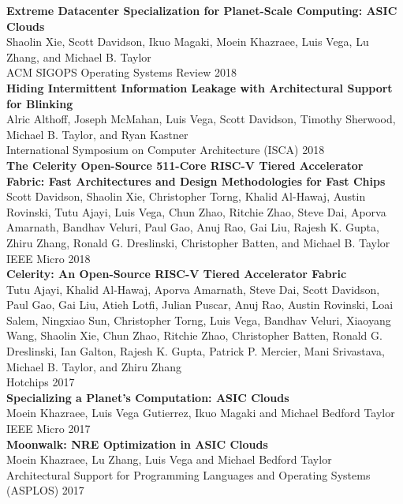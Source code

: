 \documentclass[10pt]{article}
\begin{document}
\textbf{%
  Extreme Datacenter Specialization for Planet-Scale Computing: ASIC Clouds
} \\
Shaolin Xie, Scott Davidson, Ikuo Magaki, Moein Khazraee, Luis Vega, Lu Zhang, and Michael B. Taylor \\
ACM SIGOPS Operating Systems Review 2018 \\
  
\textbf{%
  Hiding Intermittent Information Leakage with Architectural Support for Blinking
} \\
Alric Althoff, Joseph McMahan, Luis Vega, Scott Davidson, Timothy Sherwood,
Michael B. Taylor, and Ryan Kastner \\
International Symposium on Computer Architecture (ISCA) 2018 \\
  
\textbf{%
  The Celerity Open-Source 511-Core RISC-V Tiered Accelerator Fabric: Fast Architectures and Design Methodologies for Fast Chips
} \\
Scott Davidson, Shaolin Xie, Christopher Torng, Khalid Al-Hawaj, Austin Rovinski,
Tutu Ajayi, Luis Vega, Chun Zhao, Ritchie Zhao, Steve Dai, Aporva Amarnath,
Bandhav Veluri, Paul Gao, Anuj Rao, Gai Liu, Rajesh K. Gupta, Zhiru Zhang,
Ronald G. Dreslinski, Christopher Batten, and Michael B. Taylor \\
IEEE Micro 2018 \\

\textbf{%
  Celerity: An Open-Source RISC-V Tiered Accelerator Fabric
} \\
Tutu Ajayi, Khalid Al-Hawaj, Aporva Amarnath, Steve Dai, Scott Davidson,
Paul Gao, Gai Liu, Atieh Lotfi, Julian Puscar, Anuj Rao, Austin Rovinski,
Loai Salem, Ningxiao Sun, Christopher Torng, Luis Vega, Bandhav Veluri,
Xiaoyang Wang, Shaolin Xie, Chun Zhao, Ritchie Zhao, Christopher Batten,
Ronald G. Dreslinski, Ian Galton, Rajesh K. Gupta, Patrick P. Mercier,
Mani Srivastava, Michael B. Taylor, and Zhiru Zhang \\
Hotchips 2017 \\

\textbf{%
  Specializing a Planet's Computation: ASIC Clouds
} \\
Moein Khazraee, Luis Vega Gutierrez, Ikuo Magaki and Michael Bedford Taylor \\
IEEE Micro 2017 \\

\textbf{%
  Moonwalk: NRE Optimization in ASIC Clouds
} \\
Moein Khazraee, Lu Zhang, Luis Vega and Michael Bedford Taylor \\
Architectural Support for Programming Languages and Operating Systems (ASPLOS) 2017 \\
\end{document}
